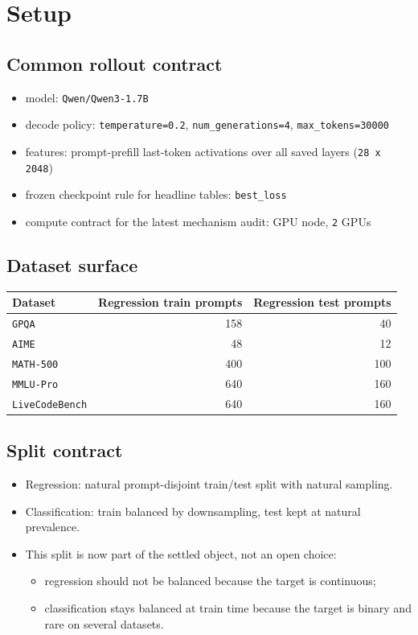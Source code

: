 \documentclass[11pt]{article}
\begin{document}
\section*{Setup}
\subsection*{Common rollout contract}
\begin{itemize}[leftmargin=1.5em]
\item model: \texttt{Qwen/Qwen3-1.7B}
\item decode policy: \texttt{temperature=0.2}, \texttt{num\_generations=4}, \texttt{max\_tokens=30000}
\item features: prompt-prefill last-token activations over all saved layers (\texttt{28 x 2048})
\item frozen checkpoint rule for headline tables: \texttt{best\_loss}
\item compute contract for the latest mechanism audit: GPU node, \texttt{2} GPUs
\end{itemize}

\subsection*{Dataset surface}
\begin{center}
\small
\begin{tabular}{@{}lrr@{}}
\toprule
Dataset & Regression train prompts & Regression test prompts \\
\midrule
\texttt{GPQA} & 158 & 40 \\
\texttt{AIME} & 48 & 12 \\
\texttt{MATH-500} & 400 & 100 \\
\texttt{MMLU-Pro} & 640 & 160 \\
\texttt{LiveCodeBench} & 640 & 160 \\
\bottomrule
\end{tabular}
\end{center}

\subsection*{Split contract}
\begin{itemize}[leftmargin=1.5em]
\item Regression: natural prompt-disjoint train/test split with natural sampling.
\item Classification: train balanced by downsampling, test kept at natural prevalence.
\item This split is now part of the settled object, not an open choice:
  \begin{itemize}[leftmargin=1.5em]
  \item regression should not be balanced because the target is continuous;
  \item classification stays balanced at train time because the target is binary and rare on several datasets.
  \end{itemize}
\end{itemize}
\end{document}
